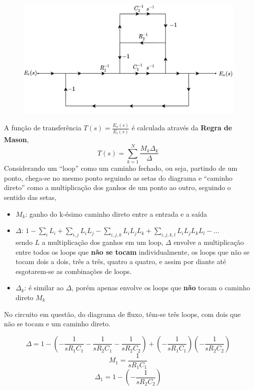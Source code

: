 \documentclass{article}
\numberwithin{equation}{section}
\begin{document}
\begin{figure}[H]
    \centering
    \includegraphics[width=\textwidth]{img/mason/exemplo.png}
\end{figure}

A função de transferência $T(s)=\displaystyle{\frac{E_{o}(s)}{E_{i}(s)}}$ é calculada através da \textbf{Regra de Mason},
$$T(s) = \sum_{k=1}^{N} \frac{M_{k}\Delta_{k}}{\Delta} $$
Considerando um ``loop'' como um caminho fechado, ou seja, partindo de um ponto, chega-se no mesmo ponto seguindo as setas do diagrama e ``caminho direto'' como a multiplicação dos ganhos de um ponto ao outro, seguindo o sentido das setas,
\begin{itemize}
    \item $M_{k}$: ganho do k-ésimo caminho direto entre a entrada e a saída
    \item $\Delta$: $1 - \displaystyle{\sum_{i}L_{i}} + \displaystyle{\sum_{i,j}L_{i}L_{j}} - \displaystyle{\sum_{i,j,k}L_{i}L_{j}L_{k}} + \displaystyle{\sum_{i,j,k,l}L_{i}L_{j}L_{k}L_{l}} - ...  $ \\ sendo $L$ a multiplicação dos ganhos em um loop, $\Delta$ envolve a multiplicação entre todos os loops que \textbf{não se tocam} individualmente, os loops que não se tocam dois a dois, três a três, quatro a quatro, e assim por diante até esgotarem-se as combinações de loops.
    \item $\Delta_{k}$: é similar ao $\Delta$, porém apenas envolve os loops que \textbf{não} tocam o caminho direto $M_{k}$
\end{itemize}

No circuito em questão, do diagrama de fluxo, têm-se três loops, com dois que não se tocam e um caminho direto.

$$\Delta = 1 - \left(-\frac{1}{sR_{1}C_{1}}-\frac{1}{sR_{2}C_{1}}-\frac{1}{sR_{2}C_{2}}\right) + \left(-\frac{1}{sR_{1}C_{1}}\right) \left(-\frac{1}{sR_{2}C_{2}}\right) $$
$$M_{1} = \frac{1}{sR_{1}C_{1}} $$
$$\Delta_{1} = 1 - \left(-\frac{1}{sR_{2}C_{2}}\right)$$
\end{document}
